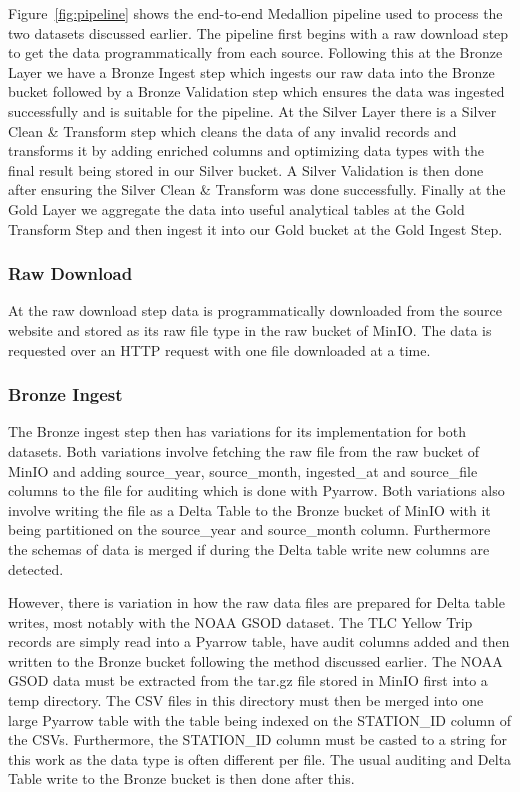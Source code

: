 \documentclass[conference]{IEEEtran}
\begin{document}
Figure~\ref{fig:pipeline} shows the end-to-end Medallion pipeline used to process the two datasets discussed earlier. The pipeline first begins with a raw download step to get the data programmatically from each source. Following this at the Bronze Layer we have a Bronze Ingest step which ingests our raw data into the Bronze bucket followed by a Bronze Validation step which ensures the data was ingested successfully and is suitable for the pipeline. At the Silver Layer there is a Silver Clean \& Transform step which cleans the data of any invalid records and transforms it by adding enriched columns and optimizing data types with the final result being stored in our Silver bucket. A Silver Validation is then done after ensuring the Silver Clean \& Transform was done successfully. Finally at the Gold Layer we aggregate the data into useful analytical tables at the Gold Transform Step and then ingest it into our Gold bucket at the Gold Ingest Step. 

\subsubsection{Raw Download}
At the raw download step data is programmatically downloaded from the source website and stored as its raw file type in the raw bucket of MinIO. The data is requested over an HTTP request with one file downloaded at a time. 

\subsubsection{Bronze Ingest}
The Bronze ingest step then has variations for its implementation for both datasets. Both variations involve fetching the raw file from the raw bucket of MinIO and adding source\_year, source\_month, ingested\_at and source\_file columns to the file for auditing which is done with Pyarrow. Both variations also involve writing the file as a Delta Table to the Bronze bucket of MinIO with it being partitioned on the source\_year and source\_month column. Furthermore the schemas of data is merged if during the Delta table write new columns are detected. 

However, there is variation in how the raw data files are prepared for Delta table writes, most notably with the NOAA GSOD dataset. The TLC Yellow Trip records are simply read into a Pyarrow table, have audit columns added and then written to the Bronze bucket following the method discussed earlier. The NOAA GSOD data must be extracted from the tar.gz file stored in MinIO first into a temp directory. The CSV files in this directory must then be merged into one large Pyarrow table with the table being indexed on the STATION\_ID column of the CSVs. Furthermore, the STATION\_ID column must be casted to a string for this work as the data type is often different per file. The usual auditing and Delta Table write to the Bronze bucket is then done after this.
\end{document}
